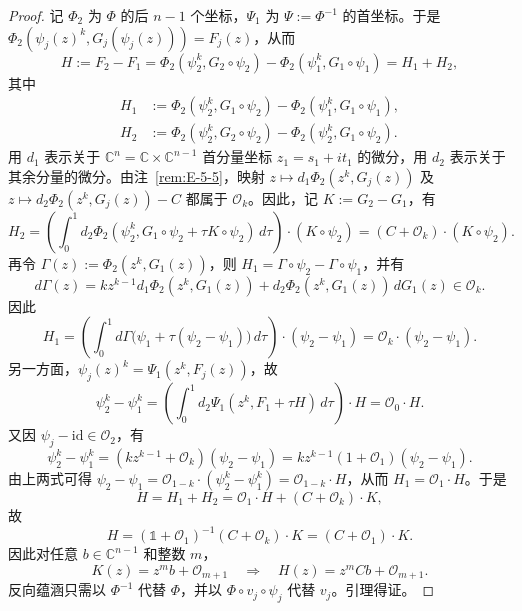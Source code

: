 \begin{proof}
记 $\Phi_2$ 为 $\Phi$ 的后 $n-1$ 个坐标，$\Psi_1$ 为 $\Psi:=\Phi^{-1}$ 的首坐标。于是 $\Phi_2(\psi_j(z)^k,G_j(\psi_j(z)))=F_j(z)$，从而
\[
  H:=F_2-F_1
    =\Phi_2(\psi_2^k,G_2\circ\psi_2)
     -\Phi_2(\psi_1^k,G_1\circ\psi_1)=H_1+H_2,
\]
其中
\begin{align*}
  H_1&:=\Phi_2(\psi_2^k,G_1\circ\psi_2)
        -\Phi_2(\psi_1^k,G_1\circ\psi_1),\\
  H_2&:=\Phi_2(\psi_2^k,G_2\circ\psi_2)
        -\Phi_2(\psi_2^k,G_1\circ\psi_2).
\end{align*}
用 $d_1$ 表示关于 $\mathbb C^n=\mathbb C\times\mathbb C^{n-1}$ 首分量坐标 $z_1=s_1+it_1$ 的微分，用 $d_2$ 表示关于其余分量的微分。由注~\ref{rem:E-5-5}，映射 $z\mapsto d_1\Phi_2(z^k,G_j(z))$ 及 $z\mapsto d_2\Phi_2(z^k,G_j(z))-C$ 都属于 $\mathcal O_k$。因此，记 $K:=G_2-G_1$，有
\[
  H_2=\left(\int_0^1d_2\Phi_2
     (\psi_2^k,G_1\circ\psi_2+\tau K\circ\psi_2)\,d\tau\right)
       \cdot(K\circ\psi_2)
     =(C+\mathcal O_k)\cdot(K\circ\psi_2).
\]
再令 $\Gamma(z):=\Phi_2(z^k,G_1(z))$，则 $H_1=\Gamma\circ\psi_2-\Gamma\circ\psi_1$，并有
\[
  d\Gamma(z)=kz^{k-1}d_1\Phi_2(z^k,G_1(z))
              +d_2\Phi_2(z^k,G_1(z))\,dG_1(z)
  \in\mathcal O_k.
\]
因此
\[
  H_1=\left(\int_0^1d\Gamma\bigl(\psi_1+\tau(\psi_2-\psi_1)\bigr)
      \,d\tau\right)\cdot(\psi_2-\psi_1)
      =\mathcal O_k\cdot(\psi_2-\psi_1).
\]
另一方面，$\psi_j(z)^k=\Psi_1(z^k,F_j(z))$，故
\[
  \psi_2^k-\psi_1^k
    =\left(\int_0^1d_2\Psi_1(z^k,F_1+\tau H)\,d\tau\right)
      \cdot H=\mathcal O_0\cdot H.
\]
又因 $\psi_j-\mathrm{id}\in\mathcal O_2$，有
\[
  \psi_2^k-\psi_1^k
   =(kz^{k-1}+\mathcal O_k)(\psi_2-\psi_1)
   =kz^{k-1}(1+\mathcal O_1)(\psi_2-\psi_1).
\]
由上两式可得 $\psi_2-\psi_1=\mathcal O_{1-k}\cdot(\psi_2^k-\psi_1^k)=\mathcal O_{1-k}\cdot H$，从而 $H_1=\mathcal O_1\cdot H$。于是
\[
  H=H_1+H_2
   =\mathcal O_1\cdot H+(C+\mathcal O_k)\cdot K,
\]
故
\[
  H=(\mathbb 1+\mathcal O_1)^{-1}(C+\mathcal O_k)\cdot K
    =(C+\mathcal O_1)\cdot K.
\]
因此对任意 $b\in\mathbb C^{n-1}$ 和整数 $m$，
\[
  K(z)=z^mb+\mathcal O_{m+1}
  \quad\Longrightarrow\quad
  H(z)=z^mCb+\mathcal O_{m+1}.
\]
反向蕴涵只需以 $\Phi^{-1}$ 代替 $\Phi$，并以 $\Phi\circ v_j\circ\psi_j$ 代替 $v_j$。引理得证。
\end{proof}
